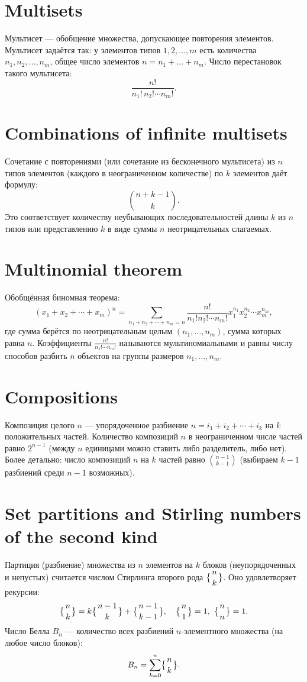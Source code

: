 \documentclass{article}
\begin{document}
	\section{Multisets}
	Мультисет --- обобщение множества, допускающее повторения элементов. Мультисет задаётся так: у элементов типов $1,2,\dots,m$ есть количества $n_1,n_2,\dots,n_m$, общее число элементов $n=n_1+\dots +n_m$. Число перестановок такого мультисета:
	\[
	\frac{n!}{n_1!\,n_2!\cdots n_m!}.
	\]
	
	\section{Combinations of infinite multisets}
	Сочетание с повторениями (или сочетание из бесконечного мультисета) из $n$ типов элементов (каждого в неограниченном количестве) по $k$ элементов даёт формулу:
	\[
	\binom{n+k-1}{k}.
	\]
	Это соответствует количеству неубывающих последовательностей длины $k$ из $n$ типов или представлению $k$ в виде суммы $n$ неотрицательных слагаемых.
	
	\section{Multinomial theorem}
	Обобщённая биномная теорема:
	\[
	(x_1 + x_2 + \cdots + x_m)^n = \sum_{n_1+n_2+\cdots+n_m=n} \frac{n!}{n_1!n_2!\cdots n_m!} x_1^{n_1}x_2^{n_2}\cdots x_m^{n_m},
	\]
	где сумма берётся по неотрицательным целым $(n_1,\dots,n_m)$, сумма которых равна $n$. Коэффициенты $\displaystyle \frac{n!}{n_1!\cdots n_m!}$ называются мультиномиальными и равны числу способов разбить $n$ объектов на группы размеров $n_1,\dots,n_m$.
	
	\section{Compositions}
	Композиция целого $n$ --- упорядоченное разбиение $n = i_1 + i_2 + \cdots + i_k$ на $k$ положительных частей. Количество композиций $n$ в неограниченном числе частей равно $2^{n-1}$ (между $n$ единицами можно ставить либо разделитель, либо нет). Более детально: число композиций $n$ на $k$ частей равно $\displaystyle \binom{n-1}{k-1}$ (выбираем $k-1$ разбиений среди $n-1$ возможных).
	
	\section{Set partitions and Stirling numbers of the second kind}
	Партиция (разбиение) множества из $n$ элементов на $k$ блоков (неупорядоченных и непустых) считается числом Стирлинга второго рода $\displaystyle \bigl\{{n\atop k}\bigr\}$. Оно удовлетворяет рекурсии:
	\[
	\bigl\{{n\atop k}\bigr\} = k\bigl\{{n-1\atop k}\bigr\} + \bigl\{{n-1\atop k-1}\bigr\}, 
	\quad \bigl\{{n\atop 1}\bigr\}=1,\ \bigl\{{n\atop n}\bigr\}=1.
	\]
	Число Белла $B_n$ --- количество всех разбиений $n$-элементного множества (на любое число блоков):
	\[
	B_n = \sum_{k=0}^n \bigl\{{n\atop k}\bigr\}.
	\]
	
\end{document}
